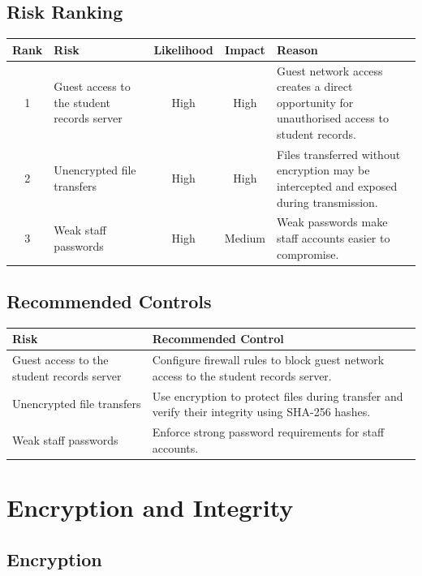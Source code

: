 \documentclass[12pt,a4paper]{article}
\begin{document}
\subsection{Risk Ranking}

\begin{center}
\begin{tabular}{|c|p{4cm}|c|c|p{5cm}|}
\hline
\textbf{Rank} & \textbf{Risk} & \textbf{Likelihood} & \textbf{Impact} & \textbf{Reason} \\
\hline
1 &
Guest access to the student records server &
High &
High &
Guest network access creates a direct opportunity for unauthorised access to student records. \\
\hline
2 &
Unencrypted file transfers &
High &
High &
Files transferred without encryption may be intercepted and exposed during transmission. \\
\hline
3 &
Weak staff passwords &
High &
Medium &
Weak passwords make staff accounts easier to compromise. \\
\hline
\end{tabular}
\end{center}

\subsection{Recommended Controls}

\begin{center}
\begin{tabular}{|p{5cm}|p{8cm}|}
\hline
\textbf{Risk} & \textbf{Recommended Control} \\
\hline
Guest access to the student records server &
Configure firewall rules to block guest network access to the student records server. \\
\hline
Unencrypted file transfers &
Use encryption to protect files during transfer and verify their integrity using SHA-256 hashes. \\
\hline
Weak staff passwords &
Enforce strong password requirements for staff accounts. \\
\hline
\end{tabular}
\end{center}

\section{Encryption and Integrity}

\subsection{Encryption}
\end{document}
